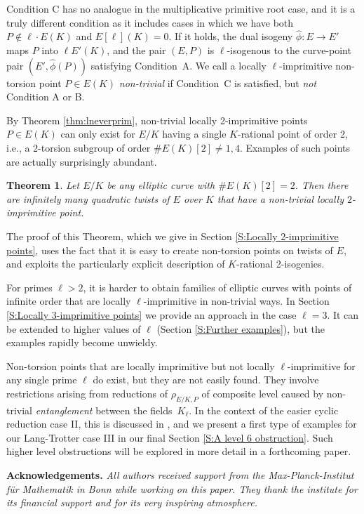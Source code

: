 \documentclass{amsart}
\theoremstyle{plain}
\newtheorem{theorem}{Theorem}[section]
\theoremstyle{definition}
\renewcommand{\hat}{\widehat}
\begin{document}
Condition C has no analogue in the multiplicative primitive root case,
and it is a truly different condition 
as it includes cases in which we have both $P\notin \ell\cdot E(K)$ and $E[\ell](K)=0$.
If it holds, the dual isogeny $\hat\phi: E\to E'$
maps $P$ into $\ell E'(K)$, and the pair
$(E,P)$ is $\ell$-isogenous to the curve-point pair $(E',\hat\phi(P))$ satisfying Condition~A.
We call a locally 
$\ell$-imprimitive non-torsion point $P\in E(K)$ 
\emph{non-trivial} if Condition~C is satisfied, but \emph{not} Condition A or B.

\medskip\noindent 
By Theorem \ref{thm:lneverprim}, non-trivial locally 2-imprimitive points $P\in E(K)$
can only exist for $E/K$ having a single $K$-rational point of order 2, i.e., 
a 2-torsion subgroup of order $\#E(K)[2]\ne 1, 4$.
Examples of such points are actually surprisingly abundant.
\begin{theorem}
\label{thm:2neverprim}
Let $E/K$ be any elliptic curve with $\#E(K)[2]=2$. 
Then there are infinitely many quadratic twists of $E$ over $K$
that have a non-trivial locally $2$-imprimitive point.
\end{theorem}
\noindent
The proof of this Theorem, which we give in Section \ref{S:Locally 2-imprimitive points},
uses the fact that it is easy to create non-torsion points on twists of $E$, and exploits the particularly 
explicit description of $K$-rational 2-isogenies.

For primes $\ell>2$, it is harder to obtain families of elliptic curves 
with points of infinite order that are
locally $\ell$-imprimitive in non-trivial ways.
In Section \ref{S:Locally 3-imprimitive points} we provide an approach
in the case $\ell=3$.
It can be extended to higher values of $\ell$ 
(Section \ref{S:Further examples}), but the examples 
rapidly become unwieldy.

\medskip\noindent 
Non-torsion points that are locally imprimitive but not locally $\ell$-imprimitive for any single prime $\ell$ do exist, but they are not easily found.
They involve restrictions arising from reductions of $\rho_{E/K,P}$ of composite level caused by
non-trivial \emph{entanglement} between the fields~$K_\ell$.
In the context of the easier cyclic reduction case II,
this is discussed in \cite{Campagna-Stevenhagen}, and we present 
a first type of examples for our Lang-Trotter case III in our final Section \ref{S:A level 6 obstruction}.
Such higher level obstructions will be explored in more detail in a forthcoming paper.

\bigskip\noindent
{\bf Acknowledgements.}
\emph{
All authors received support from the Max-Planck-Institut f\"ur Mathematik in Bonn while working on this paper.
They thank the institute for its financial support and for its very inspiring atmosphere.}
\end{document}
